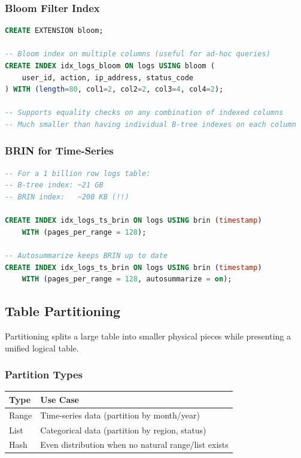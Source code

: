 \documentclass[12pt,a4paper]{article}
\begin{document}
\subsubsection{Bloom Filter Index}

\begin{lstlisting}[language=SQL, caption={Bloom filter index}]
CREATE EXTENSION bloom;

-- Bloom index on multiple columns (useful for ad-hoc queries)
CREATE INDEX idx_logs_bloom ON logs USING bloom (
    user_id, action, ip_address, status_code
) WITH (length=80, col1=2, col2=2, col3=4, col4=2);

-- Supports equality checks on any combination of indexed columns
-- Much smaller than having individual B-tree indexes on each column
\end{lstlisting}

\subsubsection{BRIN for Time-Series}

\begin{lstlisting}[language=SQL, caption={BRIN for massive time-series tables}]
-- For a 1 billion row logs table:
-- B-tree index: ~21 GB
-- BRIN index:   ~200 KB (!!)

CREATE INDEX idx_logs_ts_brin ON logs USING brin (timestamp)
    WITH (pages_per_range = 128);

-- Autosummarize keeps BRIN up to date
CREATE INDEX idx_logs_ts_brin ON logs USING brin (timestamp)
    WITH (pages_per_range = 128, autosummarize = on);
\end{lstlisting}

\subsection{Table Partitioning}

Partitioning splits a large table into smaller physical pieces while presenting a unified logical table.

\subsubsection{Partition Types}

\begin{center}
\begin{tabular}{lp{8cm}}
\toprule
\textbf{Type} & \textbf{Use Case} \\
\midrule
Range & Time-series data (partition by month/year) \\
List & Categorical data (partition by region, status) \\
Hash & Even distribution when no natural range/list exists \\
\bottomrule
\end{tabular}
\end{center}
\end{document}
